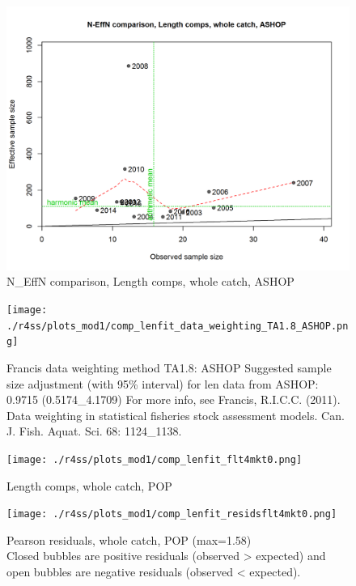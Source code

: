 \documentclass[12pt,]{article}
\begin{document}
\begin{figure}
\centering
\includegraphics{./r4ss/plots_mod1/comp_lenfit_sampsize_flt2mkt0.png}
\caption{N\_EffN comparison, Length comps, whole catch, ASHOP
\label{fig:mod1_12_comp_lenfit_sampsize_flt2mkt0}}
\end{figure}

\begin{figure}
\centering
\texttt{[image: ./r4ss/plots\_mod1/comp\_lenfit\_data\_weighting\_TA1.8\_ASHOP.png]}
\caption{Francis data weighting method TA1.8: ASHOP Suggested sample
size adjustment (with 95\% interval) for len data from ASHOP: 0.9715
(0.5174\_4.1709) For more info, see Francis, R.I.C.C. (2011). Data
weighting in statistical fisheries stock assessment models. Can. J.
Fish. Aquat. Sci. 68: 1124\_1138.
\label{fig:mod1_13_comp_lenfit_data_weighting_TA1.8_ASHOP}}
\end{figure}

\begin{figure}
\centering
\texttt{[image: ./r4ss/plots\_mod1/comp\_lenfit\_flt4mkt0.png]}
\caption{Length comps, whole catch, POP
\label{fig:mod1_14_comp_lenfit_flt4mkt0}}
\end{figure}

\begin{figure}
\centering
\texttt{[image: ./r4ss/plots\_mod1/comp\_lenfit\_residsflt4mkt0.png]}
\caption{Pearson residuals, whole catch, POP (max=1.58)\\
Closed bubbles are positive residuals (observed \textgreater{} expected)
and open bubbles are negative residuals (observed \textless{} expected).
\label{fig:mod1_15_comp_lenfit_residsflt4mkt0}}
\end{figure}
\end{document}
